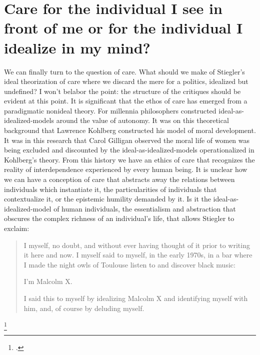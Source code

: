 \documentclass[letterpaper,notitlepage,12pt]{article}
\begin{document}
\section{Care for the individual I see in front of me or for the individual I
idealize in my mind?}

We can finally turn to the question of care.
What should we make of Stiegler's ideal theorization of care where we discard
the mere  for a politics, idealized but undefined? 
I won't belabor the point: the structure of the critiques should be evident 
at this point.
It is significant that the ethos of care has emerged from a paradigmatic nonideal
theory.
For millennia philosophers constructed ideal-as-idealized-models around the value
of autonomy.
It was on this theoretical background that Lawrence Kohlberg constructed his
model of moral development.
It was in this research that Carol Gilligan observed the moral life of women was
being excluded and discounted by the ideal-as-idealized-models operationalized
in Kohlberg's theory.
From this history we have an ethics of care that recognizes the reality of
interdependence experienced by every human being.
It is unclear how we can have a conception of care that abstracts away the
relations between individuals which instantiate it, the particularities of
individuals that contextualize it, or the epistemic humility demanded by it.
Is it the ideal-as-idealized-model of human individuals, the essentialism and
abstraction that obscures the complex richness of an individual's life, that
allows Stiegler to exclaim:
\blockquote{I myself, no doubt, and without ever having thought of it prior to
  writing it here and now. I myself said to myself, in the early 1970s, in a bar
  where I made the night owls of Toulouse listen to and discover black music:

  I'm Malcolm X.

  I said this to myself by idealizing Malcolm X and identifying myself with him,
and, of course by deluding myself.}\footcite[ch. 6.35]{stiegler_age_2019}

\nocite{searle_minds_1980}
\nocite{block_psychologism_1981}

\printbibliography
\end{document}
